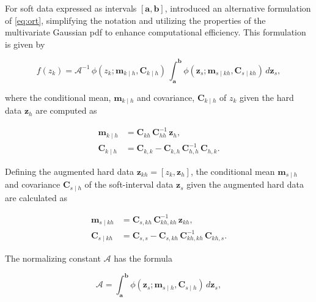 For soft data expressed as intervals \([\boldsymbol{a}, \boldsymbol{b}]\), \citet{serre1999environmental} introduced an alternative formulation of \eqref{eq:ort}, simplifying the notation and utilizing the properties of the multivariate Gaussian pdf to enhance computational efficiency. This formulation is given by

\begin{equation}
f(z_k) = \mathcal{A}^{-1} \, \phi (z_k; \boldsymbol{m}_{k \mid h}, \boldsymbol{C}_{k \mid h}) \, \int^{\boldsymbol{b}}_{\boldsymbol{a}} \phi (\boldsymbol{z}_s; \boldsymbol{m}_{s \mid kh}, \boldsymbol{C}_{s \mid kh})  \, d\boldsymbol{z}_s
\label{eq:post-k-int},
\end{equation}

where the conditional mean, \(\boldsymbol{m}_{k \mid h}\) and covariance, \(\boldsymbol{C}_{k \mid h}\) of \(z_k\) given the hard data \(\boldsymbol{z}_h\) are computed as

\vspace{-2em}

\begin{align}
\boldsymbol{m}_{k \mid h} &= \boldsymbol{C}_{k h} \, \boldsymbol{C}_{h h}^{-1} \, \boldsymbol{z}_h,
\label{eq:m-zkh}\\
\boldsymbol{C}_{k \mid h} &= \boldsymbol{C}_{k,k} - \boldsymbol{C}_{k,h} \, \boldsymbol{C}^{-1}_{h,h} \, \boldsymbol{C}_{h, k}.
\label{eq:c-zkh}
\end{align}

Defining the augmented hard data \(\boldsymbol{z}_{kh} = [z_k, \boldsymbol{z}_{h}]\), the conditional mean \(\boldsymbol{m}_{s \mid h}\) and covariance \(\boldsymbol{C}_{s \mid h}\) of the soft-interval data \(\boldsymbol{z}_s\) given the augmented hard data are calculated as

\vspace{-2em}

\begin{align}
\boldsymbol{m}_{s \mid kh} &=  \boldsymbol{C}_{s,kh} \, \boldsymbol{C}^{-1}_{kh,kh} \, \boldsymbol{z}_{kh},
\label{eq:m-zskh}\\
\boldsymbol{C}_{s \mid kh} &= \boldsymbol{C}_{s,s} - \boldsymbol{C}_{s,kh} \, \boldsymbol{C}^{-1}_{kh,kh} \, \boldsymbol{C}_{kh,s}.
\label{eq:C-zskh}
\end{align}

The normalizing constant \(\mathcal{A}\) has the formula

\begin{equation}
\mathcal{A} = \int^{\boldsymbol{b}}_{\boldsymbol{a}} \phi (\boldsymbol{z}_s; \boldsymbol{m}_{s \mid h}, \boldsymbol{C}_{s \mid h})  \, d\boldsymbol{z}_s
\label{eq:norm-constant},
\end{equation}


